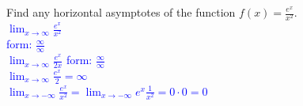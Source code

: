 \documentclass{ximera}
\begin{document}
    
\begin{exercise}    
    Find any horizontal asymptotes of the function $f(x)=\frac{e^x}{x^2}$. \\
    \textcolor{blue}{$\lim_{x\rightarrow \infty} \frac{e^x}{x^2}$\\
    form: $\frac{\infty}{\infty}$\\
    $\lim_{x\rightarrow \infty} \frac{e^x}{2x}$  form: $\frac{\infty}{\infty}$\\
    $\lim_{x\rightarrow \infty} \frac{e^x}{2}=\infty$\\
    $\lim_{x\rightarrow -\infty} \frac{e^x}{x^2}=\lim_{x\rightarrow -\infty} e^x\frac{1}{x^2}=0\cdot 0=0$}
\end{exercise}
\end{document}
